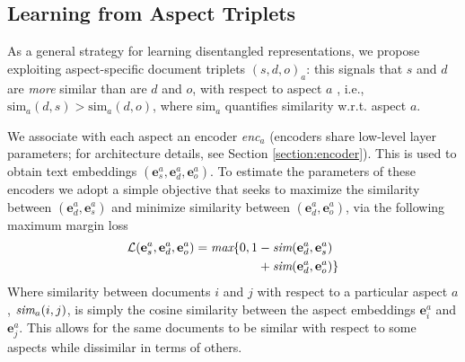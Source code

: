 \documentclass[11pt,a4paper]{article}
\begin{document}
\vspace{-.3em}
\subsection{Learning from Aspect Triplets}
\vspace{-.3em}

As a general strategy for learning disentangled representations, we propose exploiting aspect-specific document triplets $(s,d,o)_a$: this signals that $s$ and $d$ are \emph{more} similar than are $d$ and $o$, with respect to aspect $a$ \cite{karaletsos2015bayesian,veit2016conditional}, i.e., $\text{sim}_a (d, s) > \text{sim}_a (d, o)$, where sim$_a$ quantifies similarity w.r.t. aspect $a$. 



We associate with each aspect an encoder \emph{enc}$_a$ (encoders share low-level layer parameters; for architecture details, see Section \ref{section:encoder}). This is used to obtain text embeddings $(\mathbf{e}^a_s, \mathbf{e}^a_d, \mathbf{e}^a_o)$. To estimate the parameters of these encoders we adopt a simple objective that seeks to maximize the similarity between $(\mathbf{e}^a_d, \mathbf{e}^a_s)$ and minimize similarity between $(\mathbf{e}^a_d, \mathbf{e}^a_o)$, via the following maximum margin loss%
\vspace{-.2em}
\begin{equation}
\begin{aligned}
\mathcal{L}(\mathbf{e}^a_s, \mathbf{e}^a_d, \mathbf{e}^a_o) = \text{\it max}\{0,  1 &- \text{\it sim}(\mathbf{e}^a_d, \mathbf{e}^a_s) \\&+ \text{\it sim}(\mathbf{e}^a_d, \mathbf{e}^a_o)\}
\end{aligned}
\end{equation}
\noindent Where similarity between documents $i$ and $j$ with respect to a particular aspect $a$,  $\text{\it sim}_a(i, j)$, is simply the cosine similarity between the aspect embeddings $\mathbf{e}^a_i$ and $\mathbf{e}^a_j$. This allows for the same documents to be similar with respect to some aspects while dissimilar in terms of others.
\end{document}
